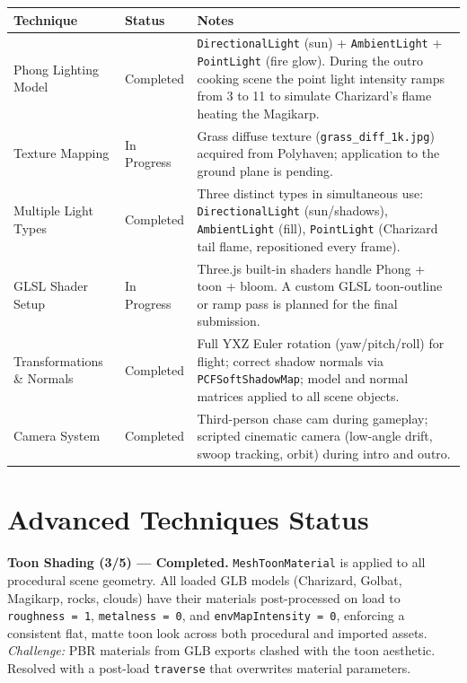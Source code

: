 \documentclass[11pt,a4paper]{article}
\begin{document}
\begin{tabular}{@{} L{3.5cm} L{2.2cm} L{8.8cm} @{}}
\toprule
\textbf{Technique} & \textbf{Status} & \textbf{Notes} \\
\midrule
Phong Lighting Model
  & Completed
  & \texttt{DirectionalLight} (sun) + \texttt{AmbientLight} + \texttt{PointLight}
    (fire glow). During the outro cooking scene the point light intensity ramps
    from 3 to 11 to simulate Charizard's flame heating the Magikarp. \\[4pt]
Texture Mapping
  & In Progress
  & Grass diffuse texture (\texttt{grass\_diff\_1k.jpg}) acquired from Polyhaven;
    application to the ground plane is pending. \\[4pt]
Multiple Light Types
  & Completed
  & Three distinct types in simultaneous use: \texttt{DirectionalLight}
    (sun/shadows), \texttt{AmbientLight} (fill), \texttt{PointLight}
    (Charizard tail flame, repositioned every frame). \\[4pt]
GLSL Shader Setup
  & In Progress
  & Three.js built-in shaders handle Phong + toon + bloom.
    A custom GLSL toon-outline or ramp pass is planned for the final
    submission. \\[4pt]
Transformations \& Normals
  & Completed
  & Full YXZ Euler rotation (yaw/pitch/roll) for flight; correct shadow
    normals via \texttt{PCFSoftShadowMap}; model and normal matrices
    applied to all scene objects. \\[4pt]
Camera System
  & Completed
  & Third-person chase cam during gameplay; scripted cinematic camera
    (low-angle drift, swoop tracking, orbit) during intro and outro. \\
\bottomrule
\end{tabular}

\section{Advanced Techniques Status}

\textbf{Toon Shading (3/5) — Completed.}
\texttt{MeshToonMaterial} is applied to all procedural scene geometry. All loaded
GLB models (Charizard, Golbat, Magikarp, rocks, clouds) have their materials
post-processed on load to \texttt{roughness = 1}, \texttt{metalness = 0}, and
\texttt{envMapIntensity = 0}, enforcing a consistent flat, matte toon look across
both procedural and imported assets.
\textit{Challenge:} PBR materials from GLB exports clashed with the toon aesthetic.
Resolved with a post-load \texttt{traverse} that overwrites material parameters.
\end{document}
